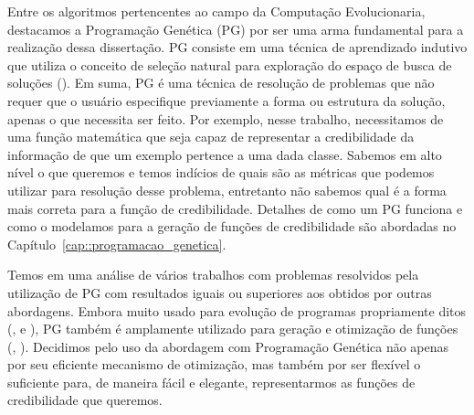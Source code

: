 Entre os algoritmos pertencentes ao campo da Computação Evolucionaria, destacamos a Programação Genética (\textsc{PG}) por ser uma arma fundamental para a realização dessa dissertação. \textsc{PG} consiste em uma técnica de aprendizado indutivo que utiliza o conceito de seleção natural para exploração do espaço de busca de soluções (\cite{Koza92}).
Em suma, \textsc{PG} é uma técnica de resolução de problemas que não requer que o usuário especifique previamente a forma ou estrutura da solução, apenas o que necessita ser feito.
Por exemplo, nesse trabalho, necessitamos de uma função matemática que seja capaz de representar a credibilidade da informação de que um exemplo pertence a uma dada classe.
Sabemos em alto nível o que queremos e temos indícios de quais são as métricas que podemos utilizar para resolução desse problema, entretanto não sabemos qual é a forma mais correta para a função de credibilidade. Detalhes de como um \textsc{PG} funciona e como o modelamos para a geração de funções de credibilidade são abordadas no Capítulo~\ref{cap::programacao_genetica}.

Temos em \cite{Koza10} uma análise de vários trabalhos com problemas resolvidos pela utilização de \textsc{PG} com resultados iguais ou superiores aos obtidos por outras abordagens.
Embora muito usado para evolução de programas propriamente ditos (\cite{Spector98}, \cite{Hauptman07} e \cite{Forrest09}),
\textsc{PG} também é amplamente utilizado para geração e otimização de funções (\cite{Golubski02}, \cite{Freitas10}). 
Decidimos pelo uso da abordagem com Programação Genética não apenas por seu eficiente mecanismo de otimização, mas também por ser flexível o suficiente para, de maneira fácil e elegante, representarmos as funções de credibilidade que queremos.


